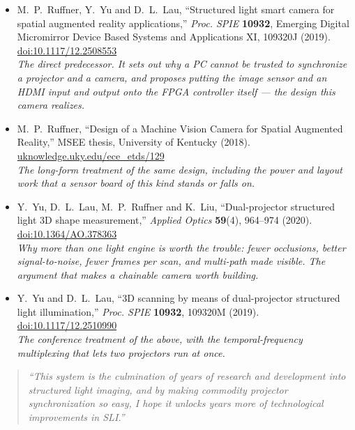 \documentclass[11pt]{article}
\begin{document}
\begin{itemize}\itemsep4pt
  \item M.~P.~Ruffner, Y.~Yu and D.~L.~Lau, ``Structured light smart camera for spatial
        augmented reality applications,'' \emph{Proc. SPIE} \textbf{10932}, Emerging
        Digital Micromirror Device Based Systems and Applications XI, 109320J (2019).
        \href{https://doi.org/10.1117/12.2508553}{doi:10.1117/12.2508553}\\
        \small\textit{The direct predecessor. It sets out why a PC cannot be trusted to
        synchronize a projector and a camera, and proposes putting the image sensor and
        an HDMI input and output onto the FPGA controller itself --- the design this
        camera realizes.}
  \item M.~P.~Ruffner, ``Design of a Machine Vision Camera for Spatial Augmented
        Reality,'' MSEE thesis, University of Kentucky (2018).
        \href{https://uknowledge.uky.edu/ece_etds/129/}{uknowledge.uky.edu/ece\_etds/129}\\
        \small\textit{The long-form treatment of the same design, including the power
        and layout work that a sensor board of this kind stands or falls on.}
  \item Y.~Yu, D.~L.~Lau, M.~P.~Ruffner and K.~Liu, ``Dual-projector structured light 3D
        shape measurement,'' \emph{Applied Optics} \textbf{59}(4), 964--974 (2020).
        \href{https://doi.org/10.1364/AO.378363}{doi:10.1364/AO.378363}\\
        \small\textit{Why more than one light engine is worth the trouble: fewer
        occlusions, better signal-to-noise, fewer frames per scan, and multi-path
        made visible. The argument that makes a chainable camera worth building.}
  \item Y.~Yu and D.~L.~Lau, ``3D scanning by means of dual-projector structured light
        illumination,'' \emph{Proc. SPIE} \textbf{10932}, 109320M (2019).
        \href{https://doi.org/10.1117/12.2510990}{doi:10.1117/12.2510990}\\
        \small\textit{The conference treatment of the above, with the temporal-frequency
        multiplexing that lets two projectors run at once.}
\end{itemize}

\vfill

\begin{quote}
\itshape
``This system is the culmination of years of research and development into structured
light imaging, and by making commodity projector synchronization so easy, I hope it
unlocks years more of technological improvements in SLI.''
\end{quote}
\end{document}
